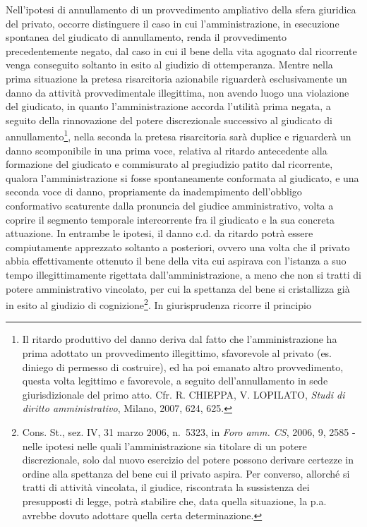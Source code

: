 \documentclass[12pt,it,a4paper,]{report}
\begin{document}
Nell'ipotesi di annullamento di un provvedimento ampliativo della sfera
giuridica del privato, occorre distinguere il caso in cui
l'amministrazione, in esecuzione spontanea del giudicato di
annullamento, renda il provvedimento precedentemente negato, dal caso in
cui il bene della vita agognato dal ricorrente venga conseguito soltanto
in esito al giudizio di ottemperanza. Mentre nella prima situazione la
pretesa risarcitoria azionabile riguarderà esclusivamente un danno da
attività provvedimentale illegittima, non avendo luogo una violazione
del giudicato, in quanto l'amministrazione accorda l'utilità prima
negata, a seguito della rinnovazione del potere discrezionale successivo
al giudicato di annullamento\footnote{Il ritardo produttivo del danno
  deriva dal fatto che l'amministrazione ha prima adottato un
  provvedimento illegittimo, sfavorevole al privato (es. diniego di
  permesso di costruire), ed ha poi emanato altro provvedimento, questa
  volta legittimo e favorevole, a seguito dell'annullamento in sede
  giurisdizionale del primo atto. Cfr. R. CHIEPPA, V. LOPILATO,
  \emph{Studi di diritto amministrativo}, Milano, 2007, 624, 625.},
nella seconda la pretesa risarcitoria sarà duplice e riguarderà un danno
scomponibile in una prima voce, relativa al ritardo antecedente alla
formazione del giudicato e commisurato al pregiudizio patito dal
ricorrente, qualora l'amministrazione si fosse spontaneamente conformata
al giudicato, e una seconda voce di danno, propriamente da inadempimento
dell'obbligo conformativo scaturente dalla pronuncia del giudice
amministrativo, volta a coprire il segmento temporale intercorrente fra
il giudicato e la sua concreta attuazione. In entrambe le ipotesi, il
danno c.d. da ritardo potrà essere compiutamente apprezzato soltanto a
posteriori, ovvero una volta che il privato abbia effettivamente
ottenuto il bene della vita cui aspirava con l'istanza a suo tempo
illegittimamente rigettata dall'amministrazione, a meno che non si
tratti di potere amministrativo vincolato, per cui la spettanza del bene
si cristallizza già in esito al giudizio di cognizione\footnote{Cons.
  St., sez. IV, 31 marzo 2006, n.~5323, in \emph{Foro amm. CS}, 2006, 9,
  2585 - nelle ipotesi nelle quali l'amministrazione sia titolare di un
  potere discrezionale, solo dal nuovo esercizio del potere possono
  derivare certezze in ordine alla spettanza del bene cui il privato
  aspira. Per converso, allorché si tratti di attività vincolata, il
  giudice, riscontrata la sussistenza dei presupposti di legge, potrà
  stabilire che, data quella situazione, la p.a. avrebbe dovuto adottare
  quella certa determinazione.}. In giurisprudenza ricorre il principio
\end{document}
